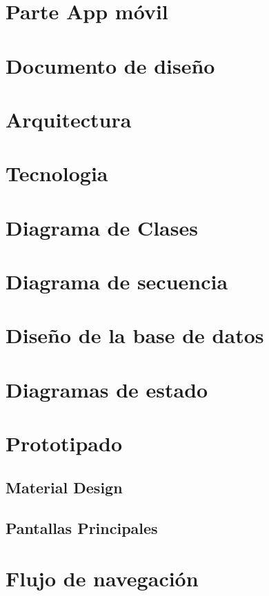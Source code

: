 \documentclass[../pfc.tex]{subfiles}
\begin{document}
	
	
	\section{Parte App móvil}
	
	\section{Documento de diseño}
	
	\section{Arquitectura}
	
	\section{Tecnologia}
	
	\section{Diagrama de Clases}
	
	\section{Diagrama de secuencia}
	
	\section{Diseño de la base de datos}
	
	\section{Diagramas de estado}
	
	\section{Prototipado}
	
		\subsection{Material Design}
		
		\subsection{Pantallas Principales}
		
	\section{Flujo de navegación}
	
	
\end{document}
